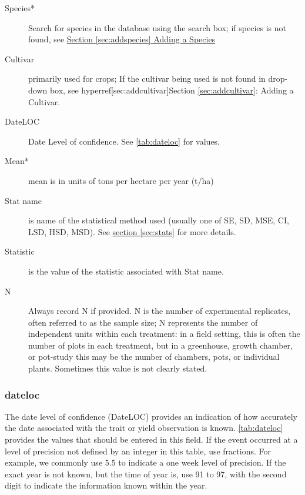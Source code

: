 \documentclass[12pt,english,portrait]{article}
\begin{document}
\begin{description}
\item[Species*] Search for species in the database using the search box; if species is not found, see \hyperref[sec:addspecies]{Section \ref*{sec:addspecies} Adding a Species} 
\item[Cultivar] primarily used for crops; If the cultivar being used is not found in drop-down box, see hyperref[sec:addcultivar]{Section \ref*{sec:addcultivar}: Adding a Cultivar}.
\item[DateLOC] Date Level of confidence. See \autoref{tab:dateloc} for values.
\item[Mean*] mean is in units of tons per hectare per year (t/ha) 
\item[Stat name] is name of the statistical method used (usually one of SE, SD, MSE, CI, LSD, HSD, MSD). See \hyperref[sec:stats]{section \ref*{sec:stats}} for more details.
\item[Statistic] is the value of the statistic associated with Stat name.
\item[N] Always record N if provided. N is the number of experimental replicates, often referred to as the sample size; N represents the number of independent units within each treatment: in a field setting, this is often the number of plots in each treatment, but in a greenhouse, growth chamber, or pot-study this may be the number of chambers, pots, or individual plants. Sometimes this value is not clearly stated.   

\end{description}

\subsubsection{dateloc}

 The date level of confidence (DateLOC) provides an indication of how accurately the date associated with the trait or yield observation is known.
 \autoref{tab:dateloc} provides the values that should be entered in this field. 
  If the event occurred at a level of precision not defined by an integer in this table, use fractions. 
 For example, we commonly use 5.5 to indicate a one week level of precision. 
 If the exact year is not known, but the time of year is, use 91 to 97, with the second digit to indicate the information known within the year.
\end{document}
